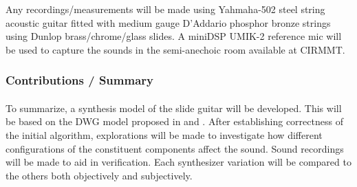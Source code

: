 \documentclass[12pt]{article}
\begin{document}
Any recordings/measurements will be made using Yahmaha-502 steel string acoustic guitar fitted with medium gauge D'Addario phosphor bronze strings using Dunlop brass/chrome/glass slides. A miniDSP UMIK-2 reference mic will be used to capture the sounds in the semi-anechoic room available at CIRMMT.

\subsubsection*{Contributions / Summary}
\paragraph{}
To summarize, a synthesis model of the slide guitar will be developed. This will be based on the DWG model proposed in \cite{pakarinen_virtual_2008} and \cite{puputti_real-time_2012}. After establishing correctness of the initial algorithm, explorations will be made to investigate how different configurations of the constituent components affect the sound. Sound recordings will be made to aid in verification. Each synthesizer variation will be compared to the others both objectively and subjectively.

\clearpage


\end{document}
